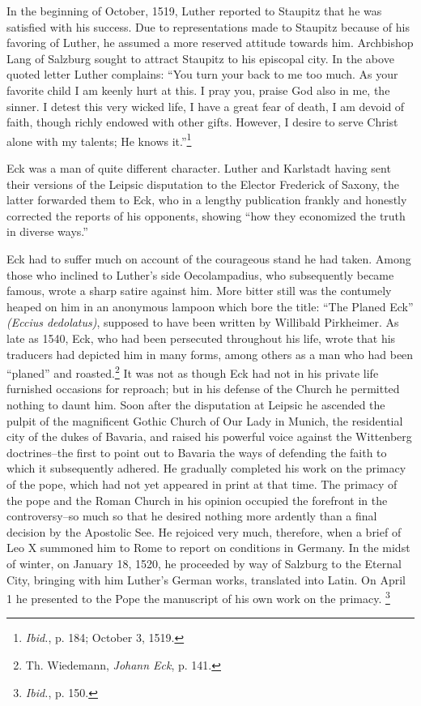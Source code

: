 In the beginning of October, 1519, Luther reported to Staupitz
that he was satisfied with his success. Due to representations made to
Staupitz because of his favoring of Luther, he assumed a more reserved
attitude towards him. Archbishop Lang of Salzburg sought
to attract Staupitz to his episcopal city. In the above quoted letter
Luther complains: “You turn your back to me too much. As your
favorite child I am keenly hurt at this. I pray you, praise God also
in me, the sinner. I detest this very wicked life, I have a great fear
of death, I am devoid of faith, though richly endowed with other
gifts. However, I desire to serve Christ alone with my talents; He
knows it.”\footnote{\textit{Ibid.}, p. 184; October 3, 1519.}

Eck was a man of quite different character. Luther and Karlstadt
having sent their versions of the Leipsic disputation to the Elector
Frederick of Saxony, the latter forwarded them to Eck, who in
a lengthy publication frankly and honestly corrected the reports of
his opponents, showing “how they economized the truth in diverse
ways.”

Eck had to suffer much on account of the courageous stand he
had taken. Among those who inclined to Luther’s side Oecolampadius,
who subsequently became famous, wrote a sharp satire against him.
More bitter still was the contumely heaped on him in an anonymous
lampoon which bore the title: “The Planed Eck” \textit{(Eccius dedolatus)},
supposed to have been written by Willibald Pirkheimer. As late as
1540, Eck, who had been persecuted throughout his life, wrote that his
traducers had depicted him in many forms, among others as a man who
had been “planed” and roasted.\footnote{Th. Wiedemann, \textit{Johann Eck}, p. 141.}
It was not as though Eck had not in
his private life furnished occasions for reproach; but in his defense
of the Church he permitted nothing to daunt him. Soon after the
disputation at Leipsic he ascended the pulpit of the magnificent
Gothic Church of Our Lady in Munich, the residential city of the
dukes of Bavaria, and raised his powerful voice against the Wittenberg
doctrines--the first to point out to Bavaria the ways of defending the
faith to which it subsequently adhered. He gradually completed his work
on the primacy of the pope, which had not yet
appeared in print at that time. The primacy of the pope and the
Roman Church in his opinion occupied the forefront in the controversy--so
much so that he desired nothing more ardently than a
final decision by the Apostolic See. He rejoiced very much, therefore,
when a brief of Leo X summoned him to Rome to report on
conditions in Germany. In the midst of winter, on January 18,
1520, he proceeded by way of Salzburg to the Eternal City, bringing with
him Luther’s German works, translated into Latin. On April
1 he presented to the Pope the manuscript of his own work on the
primacy. \footnote{\textit{Ibid.}, p. 150.}
